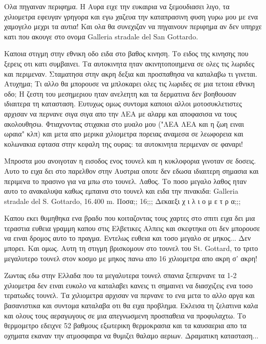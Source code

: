 
Ολα πηγαιναν περιφημα. Η Αυρα ειχε την ευκαιρια να ξεμουδιασει λιγο, τα χιλιομετρα εφευγαν γρηγορα και εγω χαζευα την καταπρασινη φυση γυρω μου με ενα χαμογελο μεχρι τα αυτια! Και ολα θα συνεχιζαν να πηγαινουν περιφημα αν δεν υπηρχε κατι που ακουγε στο ονομα Galleria stradale del San Gottardo. 

Καποια στιγμη στην εθνικη οδο ειδα στο βαθος κινηση. Το ειδος της κινησης που ξερεις οτι κατι συμβαινει. Τα αυτοκινητα ηταν ακινητοποιημενα σε ολες τις λωριδες και περιμεναν. Σταματησα στην ακρη δεξια και προσπαθησα να καταλαβω τι γινεται. Ατυχημα; 
Τι αλλο θα μπορουσε να μπλοκαρει ολες τις λωριδες σε μια τετοια εθνικη οδο; Η ζεστη του μεσημεριου ηταν ανελεητη και τα δερματινα δεν βοηθουσαν ιδιαιτερα τη κατασταση. 
Ευτυχως ομως συντομα καποιοι αλλοι μοτοσυκλετιστες αρχισαν να περνανε σιγα σιγα απο την ΛΕΑ με αλαρμ και αποφασισα να τους ακολουθησω. Φτιαχνοντας στιχακια στο μυαλο μου ("ΛΕΑ ΛΕΑ και η ζωη ειναι ωραια" κλπ) και μετα απο μερικα χιλιομετρα πορειας αναμεσα σε λεωφορεια και κολωνακια εφτασα στην κεφαλη της ουρας: τα αυτοκινητα περιμεναν σε φαναρι! 

Μπροστα μου ανοιγοταν η εισοδος ενος τουνελ και η κυκλοφορια γινοταν σε δοσεις. Αυτο το ειχα δει στο παρελθον στην Αυστρια οποτε δεν εδωσα ιδιαιτερη σημασια και περιμενα το πρασινο για να μπω στο τουνελ. Λαθος.
Το ποσο μεγαλο λαθος ηταν αυτο το ανακαλυψα καθως εμπαινα στο τουνελ και ειδα την πινακιδα: Galleria stradale del S. Gottardo, 16.400 m. Ποσα;; 16;;; Δεκαεξι χ ι λ ι ο μ ε τ ρ α;;;

Καπου εκει θυμηθηκα ενα βραδυ που κοιταζοντας τους χαρτες στο σπιτι ειχα δει μια τεραστια ευθεια γραμμη καπου στις Ελβετικες Αλπεις και σκεφτηκα οτι δεν μπορουσε να ειναι δρομος αυτο το πραγμα. Εντελως ευθεια και τοσο μεγαλο σε μηκος... Δεν μπορει. 
Και ομως. Αυτη τη στιγμη βρισκομουν στο τουνελ του St. Gottard, το τριτο μεγαλυτερο τουνελ στον κοσμο με μηκος πανω απο 16 χιλιομετρα απο ακρη σ' ακρη!


Ζωντας εδω στην Ελλαδα που τα μεγαλυτερα τουνελ σπανια ξεπερνανε τα 1-2 χιλιομετρα δεν ειναι ευκολο να καταλαβει κανεις τι σημαινει να διασχιζεις ενα τοσο τερατωδες τουνελ. 
Τα χιλιομετρα αρχισαν να περνανε το ενα μετα το αλλο αργα και βασανιστικα και συντομα καταλαβα οτι θα ειχα προβλημα. Εκλεισα τη ζελατινα καλα και ολους τους αεραγωγους σε μια απεγνωσμενη προσπαθεια να προφυλαχτω. Το θερμομετρο εδειχνε 52 βαθμους εξωτερικη θερμοκρασια και τα καυσαερια απο τα οχηματα εκαναν την ατμοσφαιρα να θυμιζει θαλαμο αεριων. Δραματικη κατασταση...

